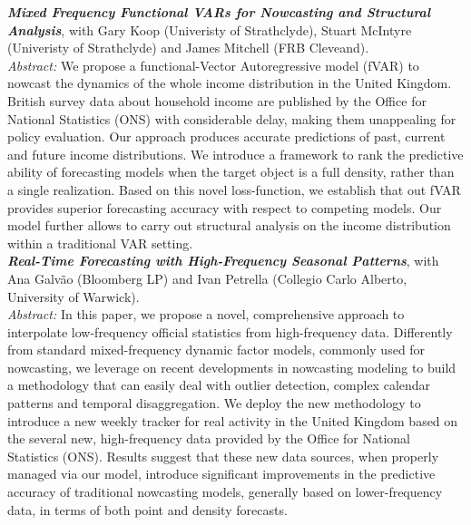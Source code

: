 \documentclass[a4paper,12pt]{article}
\begin{document}
\textit{\textbf{Mixed Frequency Functional VARs for Nowcasting and Structural Analysis}}, with Gary Koop (Univeristy of Strathclyde), Stuart McIntyre (Univeristy of Strathclyde) and James Mitchell (FRB Cleveand).\\[.5em]
\textit{Abstract:} We propose a functional-Vector Autoregressive model (fVAR) to nowcast the dynamics of the whole income distribution in the United Kingdom. British survey data about household income are published by the Office for National Statistics (ONS) with considerable delay, making them unappealing for policy evaluation. Our approach produces accurate predictions of past, current and future income distributions. We introduce a framework to rank the predictive ability of forecasting models when the target object is a full density, rather than a single realization. Based on this novel loss-function, we establish that out fVAR provides superior forecasting accuracy with respect to competing models. Our model further allows to carry out structural analysis on the income distribution within a traditional VAR setting.\\[.5em]

\textit{\textbf{Real-Time Forecasting with High-Frequency Seasonal Patterns}}, with Ana Galv\~ao (Bloomberg LP) and Ivan Petrella (Collegio Carlo Alberto, University of Warwick).\\[.5em]
\textit{Abstract:} In this paper, we propose a novel, comprehensive approach to interpolate low-frequency official statistics from high-frequency data. Differently from standard mixed-frequency dynamic factor models, commonly used for nowcasting, we leverage on recent developments in nowcasting modeling to build a methodology that can easily deal with outlier detection, complex calendar patterns and temporal disaggregation. We deploy the new methodology to introduce a new weekly tracker for real activity in the United Kingdom based on the several new, high-frequency data provided by the Office for National Statistics (ONS). Results suggest that these new data sources, when properly managed via our model, introduce significant improvements in the predictive accuracy of traditional nowcasting models, generally based on lower-frequency data, in terms of both point and density forecasts.
\end{document}
